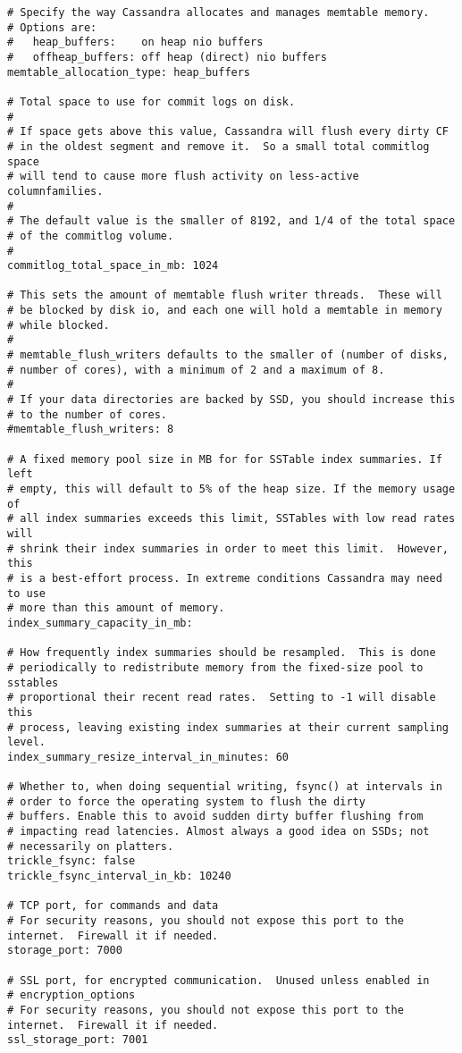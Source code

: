 \begin{verbatim}
# Specify the way Cassandra allocates and manages memtable memory.
# Options are:
#   heap_buffers:    on heap nio buffers
#   offheap_buffers: off heap (direct) nio buffers
memtable_allocation_type: heap_buffers

# Total space to use for commit logs on disk.
#
# If space gets above this value, Cassandra will flush every dirty CF
# in the oldest segment and remove it.  So a small total commitlog space
# will tend to cause more flush activity on less-active columnfamilies.
#
# The default value is the smaller of 8192, and 1/4 of the total space
# of the commitlog volume.
#
commitlog_total_space_in_mb: 1024

# This sets the amount of memtable flush writer threads.  These will
# be blocked by disk io, and each one will hold a memtable in memory
# while blocked. 
#
# memtable_flush_writers defaults to the smaller of (number of disks,
# number of cores), with a minimum of 2 and a maximum of 8.
# 
# If your data directories are backed by SSD, you should increase this
# to the number of cores.
#memtable_flush_writers: 8

# A fixed memory pool size in MB for for SSTable index summaries. If left
# empty, this will default to 5% of the heap size. If the memory usage of
# all index summaries exceeds this limit, SSTables with low read rates will
# shrink their index summaries in order to meet this limit.  However, this
# is a best-effort process. In extreme conditions Cassandra may need to use
# more than this amount of memory.
index_summary_capacity_in_mb:

# How frequently index summaries should be resampled.  This is done
# periodically to redistribute memory from the fixed-size pool to sstables
# proportional their recent read rates.  Setting to -1 will disable this
# process, leaving existing index summaries at their current sampling level.
index_summary_resize_interval_in_minutes: 60

# Whether to, when doing sequential writing, fsync() at intervals in
# order to force the operating system to flush the dirty
# buffers. Enable this to avoid sudden dirty buffer flushing from
# impacting read latencies. Almost always a good idea on SSDs; not
# necessarily on platters.
trickle_fsync: false
trickle_fsync_interval_in_kb: 10240

# TCP port, for commands and data
# For security reasons, you should not expose this port to the internet.  Firewall it if needed.
storage_port: 7000

# SSL port, for encrypted communication.  Unused unless enabled in
# encryption_options
# For security reasons, you should not expose this port to the internet.  Firewall it if needed.
ssl_storage_port: 7001


\end{verbatim}
